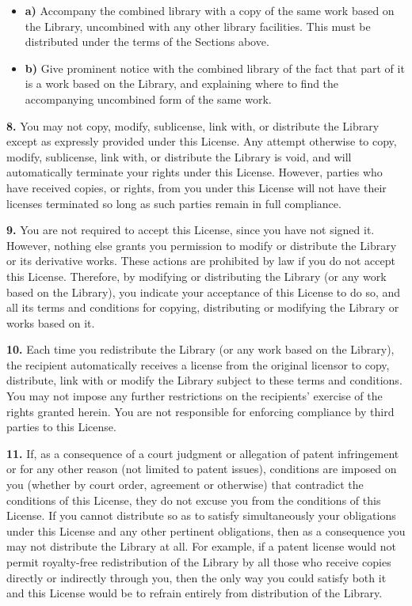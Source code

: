\documentclass[]{article}
\providecommand{\tightlist}{%
  \setlength{\itemsep}{0pt}\setlength{\parskip}{0pt}}
\begin{document}
\begin{itemize}
\tightlist
\item
  \textbf{a)} Accompany the combined library with a copy of the same
  work based on the Library, uncombined with any other library
  facilities. This must be distributed under the terms of the Sections
  above.
\item
  \textbf{b)} Give prominent notice with the combined library of the
  fact that part of it is a work based on the Library, and explaining
  where to find the accompanying uncombined form of the same work.
\end{itemize}

\textbf{8.} You may not copy, modify, sublicense, link with, or
distribute the Library except as expressly provided under this License.
Any attempt otherwise to copy, modify, sublicense, link with, or
distribute the Library is void, and will automatically terminate your
rights under this License. However, parties who have received copies, or
rights, from you under this License will not have their licenses
terminated so long as such parties remain in full compliance.

\textbf{9.} You are not required to accept this License, since you have
not signed it. However, nothing else grants you permission to modify or
distribute the Library or its derivative works. These actions are
prohibited by law if you do not accept this License. Therefore, by
modifying or distributing the Library (or any work based on the
Library), you indicate your acceptance of this License to do so, and all
its terms and conditions for copying, distributing or modifying the
Library or works based on it.

\textbf{10.} Each time you redistribute the Library (or any work based
on the Library), the recipient automatically receives a license from the
original licensor to copy, distribute, link with or modify the Library
subject to these terms and conditions. You may not impose any further
restrictions on the recipients' exercise of the rights granted herein.
You are not responsible for enforcing compliance by third parties to
this License.

\textbf{11.} If, as a consequence of a court judgment or allegation of
patent infringement or for any other reason (not limited to patent
issues), conditions are imposed on you (whether by court order,
agreement or otherwise) that contradict the conditions of this License,
they do not excuse you from the conditions of this License. If you
cannot distribute so as to satisfy simultaneously your obligations under
this License and any other pertinent obligations, then as a consequence
you may not distribute the Library at all. For example, if a patent
license would not permit royalty-free redistribution of the Library by
all those who receive copies directly or indirectly through you, then
the only way you could satisfy both it and this License would be to
refrain entirely from distribution of the Library.
\end{document}
